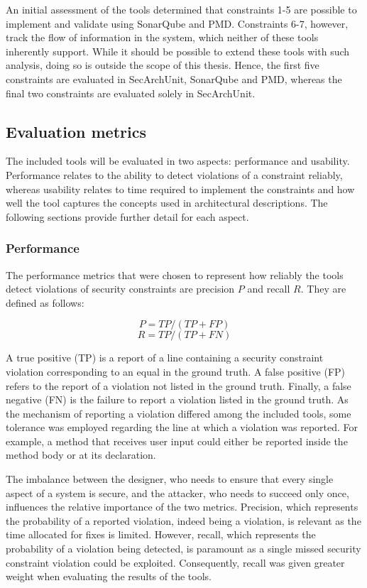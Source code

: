 An initial assessment of the tools determined that constraints 1-5 are possible to implement and validate using SonarQube and PMD. Constraints 6-7, however, track the flow of information in the system, which neither of these tools inherently support. While it should be possible to extend these tools with such analysis, doing so is outside the scope of this thesis.
Hence, the first five constraints are evaluated in SecArchUnit, SonarQube and PMD, whereas the final two constraints are evaluated solely in SecArchUnit.



\subsection{Evaluation metrics}
The included tools will be evaluated in two aspects: performance and usability. Performance relates to the ability to detect violations of a constraint reliably, whereas usability relates to time required to implement the constraints and how well the tool captures the concepts used in architectural descriptions. The following sections provide further detail for each aspect.

\subsubsection{Performance}
The performance metrics that were chosen to represent how reliably the tools detect violations of security constraints are precision $P$ and recall $R$. They are defined as follows:

\[ P = TP / (TP + FP) \]
\[ R = TP / (TP + FN) \]

A true positive (TP) is a report of a line containing a security constraint violation corresponding to an equal in the ground truth. A false positive (FP) refers to the report of a violation not listed in the ground truth. Finally, a false negative (FN) is the failure to report a violation listed in the ground truth. As the mechanism of reporting a violation differed among the included tools, some tolerance was employed regarding the line at which a violation was reported. For example, a method that receives user input could either be reported inside the method body or at its declaration.

The imbalance between the designer, who needs to ensure that every single aspect of a system is secure, and the attacker, who needs to succeed only once, influences the relative importance of the two metrics. Precision, which represents the probability of a reported violation, indeed being a violation, is relevant as the time allocated for fixes is limited. However, recall, which represents the probability of a violation being detected, is paramount as a single missed security constraint violation could be exploited. Consequently, recall was given greater weight when evaluating the results of the tools.

